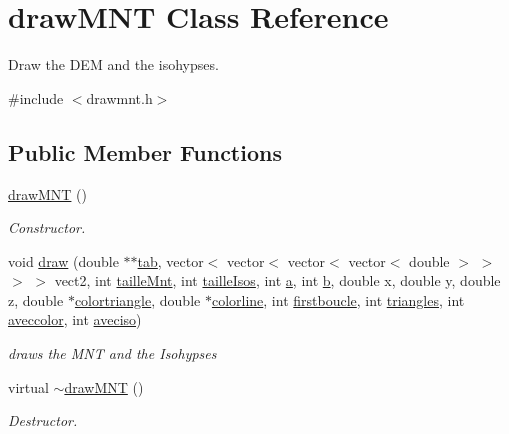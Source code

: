 \hypertarget{classdraw_m_n_t}{\section{draw\+M\+N\+T Class Reference}
\label{classdraw_m_n_t}
}


Draw the D\+E\+M and the isohypses.  




{\ttfamily \#include $<$drawmnt.\+h$>$}

\subsection*{Public Member Functions}
\begin{DoxyCompactItemize}
\item 
\hyperlink{classdraw_m_n_t_a8b2451321eb6cb1b3fff25f02c0c77d5}{draw\+M\+N\+T} ()
\begin{DoxyCompactList}\small\item\em Constructor. \end{DoxyCompactList}\item 
void \hyperlink{classdraw_m_n_t_afe6a803b7deb4e8ada127754686e5d0a}{draw} (double $\ast$$\ast$\hyperlink{main__opengl_8cpp_a95940fa0c2498b0cf8ee4c55d75dda0e}{tab}, vector$<$ vector$<$ vector$<$ vector$<$ double $>$ $>$ $>$ $>$ vect2, int \hyperlink{main__opengl_8cpp_a9efcf9efc78327c91a85e87f72bcabe3}{taille\+Mnt}, int \hyperlink{main__opengl_8cpp_a3a7f1a486821291141a1c77aca9a0ec9}{taille\+Isos}, int \hyperlink{main__opengl_8cpp_aa4c2a5552e9bc49b1816ff532f558c74}{a}, int \hyperlink{main__opengl_8cpp_a148e3876077787926724625411d6e7a9}{b}, double x, double y, double z, double $\ast$\hyperlink{main__opengl_8cpp_ae84a0027e9d218387b4f7b2e5b22b7cf}{colortriangle}, double $\ast$\hyperlink{main__opengl_8cpp_a6360d1f3529ea575f09476f76fd2b09d}{colorline}, int \hyperlink{main__opengl_8cpp_af056ce6641128930a6dc802994432a81}{firstboucle}, int \hyperlink{main__opengl_8cpp_a59657169fbae91a2b49e70def42768d7}{triangles}, int \hyperlink{main__opengl_8cpp_a3f724bce56487f1b6d3f0250a6f8ef3b}{aveccolor}, int \hyperlink{main__opengl_8cpp_a85a55639db94c0846cd6c16fb32f3fd8}{aveciso})
\begin{DoxyCompactList}\small\item\em draws the M\+N\+T and the Isohypses \end{DoxyCompactList}\item 
virtual \hyperlink{classdraw_m_n_t_ae595edf446c05cbe9b894702486feda4}{$\sim$draw\+M\+N\+T} ()
\begin{DoxyCompactList}\small\item\em Destructor. \end{DoxyCompactList}\end{DoxyCompactItemize}
